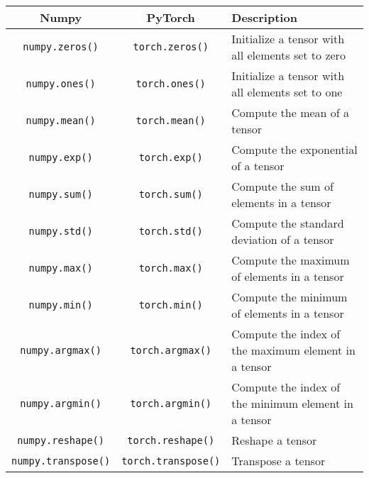 \documentclass{article}
\begin{document}
\begin{tabular}{|c|c|p{7cm}|}
\hline
Numpy & PyTorch & Description \\ \hline
\texttt{numpy.zeros()} & \texttt{torch.zeros()} & Initialize a tensor with all elements set to zero \\ \hline
\texttt{numpy.ones()} & \texttt{torch.ones()} & Initialize a tensor with all elements set to one \\ \hline
\texttt{numpy.mean()} & \texttt{torch.mean()} & Compute the mean of a tensor \\ \hline
\texttt{numpy.exp()} & \texttt{torch.exp()} & Compute the exponential of a tensor \\ \hline
\texttt{numpy.sum()} & \texttt{torch.sum()} & Compute the sum of elements in a tensor \\ \hline
\texttt{numpy.std()} & \texttt{torch.std()} & Compute the standard deviation of a tensor \\ \hline
\texttt{numpy.max()} & \texttt{torch.max()} & Compute the maximum of elements in a tensor \\ \hline
\texttt{numpy.min()} & \texttt{torch.min()} & Compute the minimum of elements in a tensor \\ \hline
\texttt{numpy.argmax()} & \texttt{torch.argmax()} & Compute the index of the maximum element in a tensor \\ \hline
\texttt{numpy.argmin()} & \texttt{torch.argmin()} & Compute the index of the minimum element in a tensor \\ \hline
\texttt{numpy.reshape()} & \texttt{torch.reshape()} & Reshape a tensor \\ \hline
\texttt{numpy.transpose()} & \texttt{torch.transpose()} & Transpose a tensor \\ \hline
\end{tabular}
\end{document}

